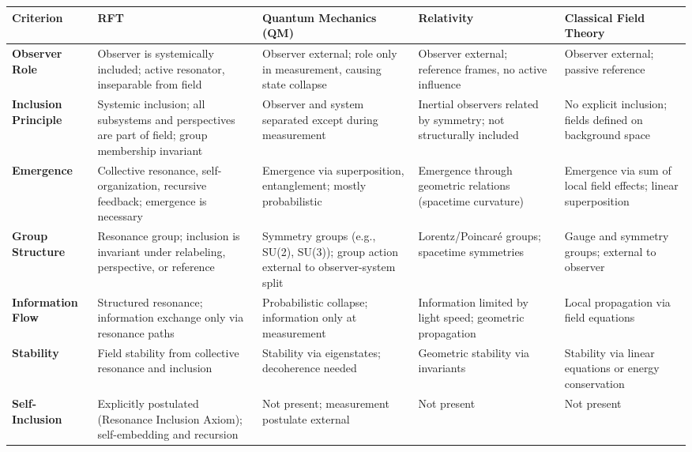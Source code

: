 \documentclass[12pt]{article}
\begin{document}
	\begin{table}[ht]
		\centering
		\renewcommand{\arraystretch}{1.3}
		\begin{tabular}{|p{4cm}|p{3cm}|p{3cm}|p{3cm}|p{3cm}|}
			\hline
			\textbf{Criterion} & \textbf{RFT} & \textbf{Quantum Mechanics (QM)} & \textbf{Relativity} & \textbf{Classical Field Theory} \\
			\hline
			\textbf{Observer Role} & Observer is systemically included; active resonator, inseparable from field & Observer external; role only in measurement, causing state collapse & Observer external; reference frames, no active influence & Observer external; passive reference \\
			\hline
			\textbf{Inclusion Principle} & Systemic inclusion; all subsystems and perspectives are part of field; group membership invariant & Observer and system separated except during measurement & Inertial observers related by symmetry; not structurally included & No explicit inclusion; fields defined on background space \\
			\hline
			\textbf{Emergence} & Collective resonance, self-organization, recursive feedback; emergence is necessary & Emergence via superposition, entanglement; mostly probabilistic & Emergence through geometric relations (spacetime curvature) & Emergence via sum of local field effects; linear superposition \\
			\hline
			\textbf{Group Structure} & Resonance group; inclusion is invariant under relabeling, perspective, or reference & Symmetry groups (e.g., SU(2), SU(3)); group action external to observer-system split & Lorentz/Poincaré groups; spacetime symmetries & Gauge and symmetry groups; external to observer \\
			\hline
			\textbf{Information Flow} & Structured resonance; information exchange only via resonance paths & Probabilistic collapse; information only at measurement & Information limited by light speed; geometric propagation & Local propagation via field equations \\
			\hline
			\textbf{Stability} & Field stability from collective resonance and inclusion & Stability via eigenstates; decoherence needed & Geometric stability via invariants & Stability via linear equations or energy conservation \\
			\hline
			\textbf{Self-Inclusion} & Explicitly postulated (Resonance Inclusion Axiom); self-embedding and recursion & Not present; measurement postulate external & Not present & Not present \\

\end{tabular}
\end{table}
\end{document}
